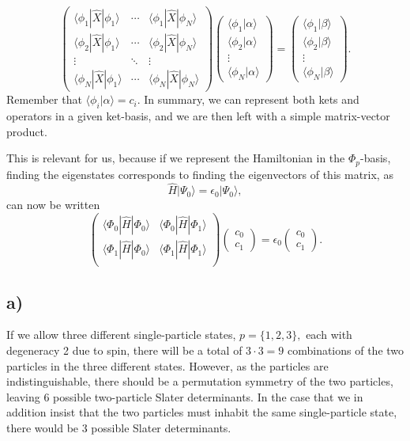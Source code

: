 \documentclass[a4paper, 11pt, notitlepage, english]{article}
\newcommand{\ket}[1]{|#1 \rangle}
\newcommand{\braket}[2]{\langle #1 | #2 \rangle}
\newcommand{\op}[1]{\hat{#1}}
\newcommand{\braopket}[3]{\langle #1 | {#2} | #3 \rangle}
\newcommand{\eps}{\epsilon}
\begin{document}
$$
\begin{pmatrix}
\braopket{\phi_1}{\op{X}}{\phi_1} & \cdots & \braopket{\phi_1}{\op{X}}{\phi_N} \\
\braopket{\phi_2}{\op{X}}{\phi_1} & \cdots & \braopket{\phi_2}{\op{X}}{\phi_N} 
\\
\vdots & \ddots & \vdots \\
\braopket{\phi_N}{\op{X}}{\phi_1} & \cdots & \braopket{\phi_N}{\op{X}}{\phi_N}
\end{pmatrix}
\begin{pmatrix}
\braket{\phi_1}{\alpha} \\
\braket{\phi_2}{\alpha} \\
\vdots \\
\braket{\phi_N}{\alpha}
\end{pmatrix}
=
\begin{pmatrix}
\braket{\phi_1}{\beta} \\
\braket{\phi_2}{\beta} \\
\vdots \\
\braket{\phi_N}{\beta}
\end{pmatrix}.
$$
Remember that $\braket{\phi_i}{\alpha} = c_i$. In summary, we can represent both kets and operators in a given ket-basis, and we are then left with a simple matrix-vector product.

This is relevant for us, because if we represent the Hamiltonian in the $\Phi_p$-basis, finding the eigenstates corresponds to finding the eigenvectors of this matrix, as
$$\op{H}\ket{\Psi_0} = \eps_0 \ket{\Psi_0},$$
can now be written
$$
\begin{pmatrix}
\braopket{\Phi_0}{\op{H}}{\Phi_0} & \braopket{\Phi_0}{\op{H}}{\Phi_1} \\
\braopket{\Phi_1}{\op{H}}{\Phi_0} & \braopket{\Phi_1}{\op{H}}{\Phi_1} \\
\end{pmatrix}
\begin{pmatrix}
    c_0 \\ c_1
\end{pmatrix} 
= \eps_0 \begin{pmatrix}
    c_0 \\ c_1
\end{pmatrix} 
.$$





\subsection*{a)}
If we allow three different single-particle states, $p=\{1,2,3\},$ each with degeneracy 2 due to spin, there will be a total of $3\cdot 3 = 9$ combinations of the two particles in the three different states. However, as the particles are indistinguishable, there should be a permutation symmetry of the two particles, leaving 6 possible two-particle Slater determinants. In the case that we in addition insist that the two particles must inhabit the same single-particle state, there would be 3 possible Slater determinants.
\end{document}

